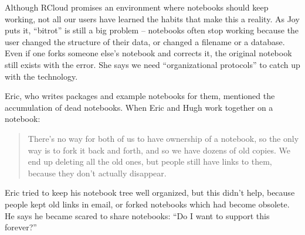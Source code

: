 Although RCloud promises an environment where notebooks should keep working,
not all our users have learned the habits that make this a reality. As Joy
puts it, ``bitrot'' is still a big problem -- notebooks often
stop working because the user changed the structure of their data, or
changed a filename or a database. Even if one forks someone
else's notebook and corrects it, the original notebook still exists with
the error. She says we need ``organizational protocols'' to catch up with the technology.

Eric, who writes packages and example notebooks for them, mentioned the
accumulation of dead notebooks. When Eric and Hugh work together on a notebook:
\begin{quote}
There's no way for both of us to have ownership of a notebook, so the only
way is to fork it back and forth, and so we have dozens of old copies. We
end up deleting all the old ones, but people still have links to them,
because they don't actually disappear.
\end{quote}

Eric tried to keep his notebook
tree well organized, but this didn't help, because people kept old links
in email, or forked notebooks which had become obsolete.
He says he became scared to share notebooks: ``Do I want to support this forever?''

